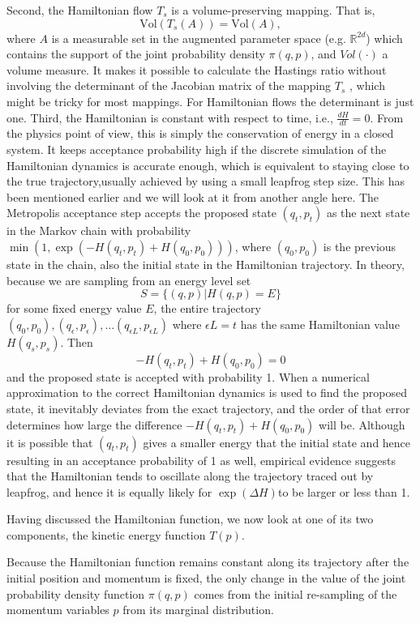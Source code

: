 \documentclass[12pt]{report}
\begin{document}
Second, the Hamiltonian flow $T_s$ is a volume-preserving mapping. That is, 
\[ \text{Vol}(T_s(A)) = \text{Vol}(A), \]
where $A$ is a measurable set in the augmented parameter space (e.g.
$\mathbb{R}^{2d}$) which contains
the support of 
the joint probability density $\pi(q,p)$, and $Vol(\cdot)$ a volume measure. 
It makes it
possible to calculate the Hastings ratio without involving the determinant of
the Jacobian matrix of the mapping $T_s$ , which might be tricky for most
mappings. For Hamiltonian flows the determinant is just one.
Third, the Hamiltonian is constant with respect to time, i.e., $\frac{dH}{dt} =
0$. From the physics point of view, this is simply the conservation of energy in
a closed system. It keeps acceptance probability high if the discrete simulation
of the Hamiltonian dynamics is accurate enough, which is equivalent to staying
close to the true trajectory,usually achieved by using a small leapfrog step size. This has been mentioned earlier
and we will look at it from another angle here. The Metropolis acceptance step
accepts the proposed state $(q_t,p_t)$ as the next state in the Markov chain
with probability $\min(1, \exp(-H(q_t,p_t) + H(q_0,p_0)))$, where $(q_0,p_0)$ is
the previous state in the chain, also the initial state in the Hamiltonian
trajectory. In theory, because we are sampling from an energy level set 
\[ S=\{(q,p)|H(q,p)=E\} \]
for some fixed energy value $E$, the entire trajectory
$(q_0,p_0),(q_\epsilon,p_\epsilon),\dots (q_{\epsilon L},p_{\epsilon L})$ where
$\epsilon L = t $ has the same Hamiltonian value $H(q_s,p_s)$. Then 
\[ -H(q_t,p_t) + H(q_0,p_0) = 0 \]
and the proposed state is accepted with probability 1. When a numerical
approximation to the correct Hamiltonian dynamics is used to find the proposed
state, it inevitably deviates from the exact trajectory, and the order of that
error determines how large the difference $ -H(q_t,p_t) + H(q_0,p_0)$ will be.
Although it is possible that $(q_t,p_t)$ gives a smaller energy that the initial
state and hence resulting in an acceptance probability of 1 as well, empirical
evidence suggests that the Hamiltonian tends to oscillate along the trajectory
traced out by leapfrog, and hence it is equally likely for $\exp(\Delta H)$to be
larger or less than 1. 

Having discussed the Hamiltonian function, we now look at one of its two
components, the kinetic energy function $T(p)$.  

Because the
Hamiltonian function remains constant along its trajectory after the initial
position and momentum is fixed, the only change in the value of the joint probability
density function $\pi(q,p)$ comes from the initial re-sampling of the momentum variables $p$
from its marginal distribution.
\end{document}

